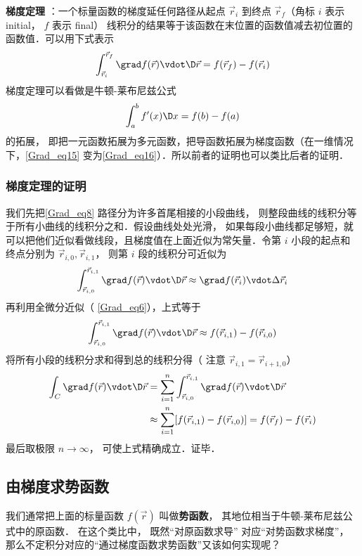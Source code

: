 \textbf{梯度定理} ：一个标量函数的梯度延任何路径从起点 $\vec r_i$ 到终点 $\vec r_f$（角标 $i$ 表示 initial， $f$ 表示 final）  线积分的结果等于该函数在末位置的函数值减去初位置的函数值．可以用下式表示
\begin{equation}\label{Grad_eq15}
\int_{\vec r_i}^{\vec r_f} \grad f(\vec r) \vdot \D \vec r = f(\vec r_f) - f(\vec r_i)
\end{equation}
梯度定理可以看做是牛顿-莱布尼兹公式
\begin{equation}\label{Grad_eq16}
\int_a^b {f'(x)\D x}  = f(b) - f(a)
\end{equation}
的拓展， 即把一元函数拓展为多元函数，把导函数拓展为梯度函数（在一维情况下，\autoref{Grad_eq15} 变为\autoref{Grad_eq16}）．所以前者的证明也可以类比后者的证明．

\subsubsection{梯度定理的证明}

我们先把\autoref{Grad_eq8} 路径分为许多首尾相接的小段曲线， 则整段曲线的线积分等于所有小曲线的线积分之和．假设曲线处处光滑， 如果每段小曲线都足够短，就可以把他们近似看做线段，且梯度值在上面近似为常矢量．令第 $i$ 小段的起点和终点分别为 $\vec r_{i,0}, \vec r_{i,1}$， 则第 $i$ 段的线积分可近似为
\begin{equation}
\int_{\vec r_{i,0}}^{\vec r_{i,1}} \grad f(\vec r) \vdot \D \vec r \approx  \grad f(\vec r_i) \vdot \Delta \vec r_i
\end{equation}
再利用全微分近似（ \autoref{Grad_eq6}），上式等于
\begin{equation}
\int_{\vec r_{i,0}}^{\vec r_{i,1}} \grad f(\vec r) \vdot \D \vec r \approx f(\vec r_{i,1}) - f(\vec r_{i,0})
\end{equation}
将所有小段的线积分求和得到总的线积分得（ 注意 $\vec r_{i,1} = \vec r_{i+1,0}$） 
\begin{equation}\begin{aligned}
\int_{C} \grad f(\vec r) \vdot \D \vec r
&= \sum_{i=1}^n \int_{\vec r_{i,0}}^{\vec r_{i,1}} \grad f(\vec r) \vdot \D \vec r\\
&\approx  \sum_{i=1}^n [f(\vec r_{i,1}) - f(\vec r_{i,0})] 
= f(\vec r_f) - f(\vec r_i)
\end{aligned}\end{equation}
最后取极限 $n\to \infty$， 可使上式精确成立．证毕．

\subsection{由梯度求势函数}
我们通常把上面的标量函数 $f(\vec r)$ 叫做\textbf{势函数}， 其地位相当于牛顿-莱布尼兹公式中的原函数． 在这个类比中， 既然“对原函数求导” 对应“对势函数求梯度”， 那么不定积分对应的“通过梯度函数求势函数”又该如何实现呢？

